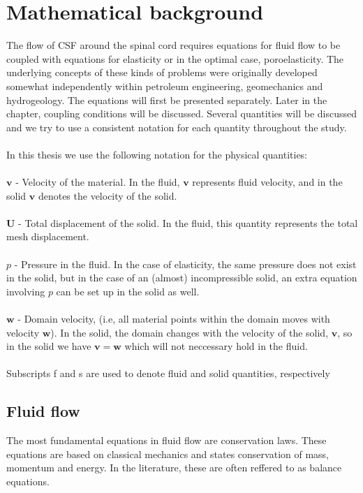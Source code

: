 \chapter{Mathematical background}
The flow of CSF around the spinal cord requires equations for fluid flow to be coupled with equations for elasticity or in the optimal case, poroelasticity. The underlying concepts of these kinds of problems were originally developed somewhat independently within petroleum engineering, geomechanics and hydrogeology. The equations will first be presented separately. Later in the chapter, coupling conditions will be discussed. Several quantities will be discussed and we try to use a consistent notation for each quantity throughout the study. 
\\
\\
In this thesis we use the following notation for the physical quantities: \\ \\
$\mathbf{v}$ - Velocity of the material. In the fluid, $\mathbf{v}$ represents fluid velocity, and in the solid $\mathbf{v}$ denotes the velocity of the solid.
\\ \\
$ \mathbf{U}$ - Total displacement of the solid. In the fluid, this quantity represents the total mesh displacement. 
\\
\\
$p$ - Pressure in the fluid. In the case of elasticity, the same pressure does not exist in the solid, but in the case of an (almost) incompressible solid, an extra equation involving $p$ can be set up in the solid as well. 
\\
\\
$\mathbf{w}$ - Domain velocity, (i.e, all material points within the domain moves with velocity $\mathbf{w}$). In the solid, the domain changes with the velocity of the solid, $\mathbf{v}$, so in the solid we have $\mathbf{v} = \mathbf{w}$ which will not neccessary hold in the fluid.
\\
\\
Subscripts f and s are used to denote fluid and solid quantities, respectively
\section{Fluid flow}
The most fundamental equations in fluid flow are conservation laws. These equations are based on classical mechanics and states conservation of mass, momentum and energy. In the literature, these are often reffered to as balance equations. 

